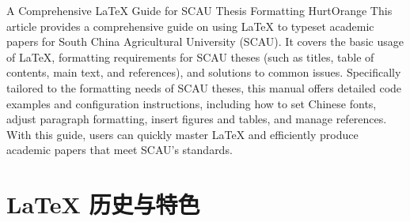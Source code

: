 \documentclass[UTF8,AutoFakeBold=1,AutoFakeSlant,zihao=-4]{SCAU}
\begin{document}
\coverpage      %



\begin{authorization}
\end{authorization}

\begin{abstract}
本文详细介绍了如何使用 LaTeX 排版华南农业大学（SCAU）的学术论文。内容涵盖了 LaTeX 的基本使用方法、论文格式要求（如标题、目录、正文、参考文献等），以及常见问题的解决方案。本文特别针对 SCAU 论文的格式需求，提供了详细的代码示例和配置说明，包括如何设置中文字体、调整段落格式、插入图表、管理参考文献等。通过本手册，用户可以快速掌握 LaTeX 的使用技巧，高效完成符合 SCAU 标准的学术论文排版。

\end{abstract}



\begin{abstractEN}
{A Comprehensive LaTeX Guide for SCAU Thesis Formatting}  %
{HurtOrange}  %
{This article provides a comprehensive guide on using LaTeX to typeset academic papers for South China Agricultural University (SCAU). It covers the basic usage of LaTeX, formatting requirements for SCAU theses (such as titles, table of contents, main text, and references), and solutions to common issues. Specifically tailored to the formatting needs of SCAU theses, this manual offers detailed code examples and configuration instructions, including how to set Chinese fonts, adjust paragraph formatting, insert figures and tables, and manage references. With this guide, users can quickly master LaTeX and efficiently produce academic papers that meet SCAU's standards.}  %
\end{abstractEN}

\contentpage




\section{LaTeX 历史与特色}
\end{document}
